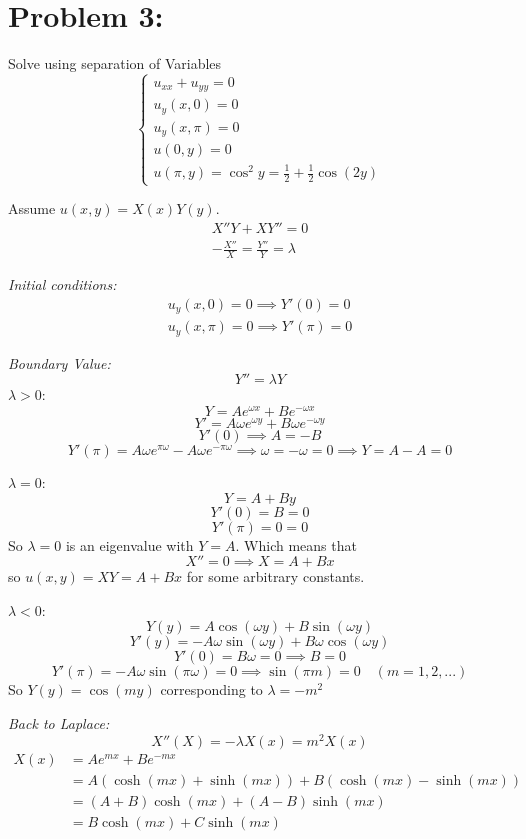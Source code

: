 \documentclass[12pt]{article}
\begin{document}
\section*{Problem 3:}
Solve using separation of Variables
\[\begin{cases}
    u_{xx} + u_{yy} = 0\\
    u_y(x, 0) = 0\\
    u_y(x, \pi) = 0\\
    u(0, y) = 0\\
    u(\pi, y) = \cos^2 y = \frac{1}{2}+\frac{1}{2}\cos(2y)
\end{cases}\]

\color{blue}
Assume $u(x, y) = X(x)Y(y)$. 
\begin{gather*}
    X''Y + XY'' = 0\\
    -\frac{X''}{X} = \frac{Y''}{Y} = \lambda
\end{gather*}

\emph{Initial conditions:}
\begin{gather*}
    u_y(x, 0) = 0 \implies Y'(0) = 0\\
    u_y(x, \pi) = 0 \implies Y'(\pi) = 0
\end{gather*}

\emph{Boundary Value:}
\[Y'' = \lambda Y\]
$\lambda > 0$: 
\[Y = Ae^{\omega x} + Be^{-\omega x}\]
\[Y' = A\omega e^{\omega y} + B\omega e^{-\omega y}\]
\[Y'(0) \implies A = - B\]
\[Y'(\pi) = A\omega e^{\pi \omega} - A\omega e^{-\pi \omega} \implies \omega = -\omega = 0 \implies Y = A - A = 0\]

$\lambda = 0$:
\[Y = A + By\]
\[Y'(0) = B = 0\]
\[Y'(\pi) = 0 = 0\]
So $\lambda = 0$ is an eigenvalue with $Y = A$. Which means that 
\[X'' = 0 \implies X = A+ Bx\]
so $u(x, y) = XY = A + Bx$ for some arbitrary constants.

$\lambda < 0$:
\[Y(y) = A\cos(\omega y) + B\sin(\omega y)\]
\[Y'(y) = -A\omega \sin(\omega y) + B\omega\cos(\omega y)\]
\[Y'(0) = B\omega = 0 \implies B = 0\]
\[Y'(\pi) = -A\omega \sin(\pi \omega) = 0 \implies \sin(\pi m) = 0 \quad (m=1, 2, ...)\]
So $Y(y) = \cos(my)$ corresponding to $\lambda = -m^2$

\emph{Back to Laplace:}
\[X''(X) = -\lambda X(x) = m^2X(x)\]
\begin{align*}
    X(x) &= Ae^{mx} + Be^{-mx}\\
    &= A(\cosh(mx) + \sinh(mx)) + B(\cosh(mx)- \sinh(mx))\\
    &= (A + B)\cosh(mx) + (A-B)\sinh(mx)\\
    &= B\cosh(mx) + C\sinh(mx)
\end{align*}
\end{document}
